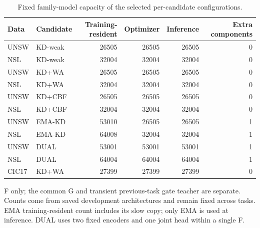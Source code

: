 \begin{table}[t]
\centering\scriptsize
\setlength{\tabcolsep}{3.8pt}
\caption{Fixed family-model capacity of the selected per-candidate configurations.}\label{tab:fixed-compact-capacity}
\begin{tabular}{llrrrr}
\toprule
Data & Candidate & Training-resident & Optimizer & Inference & Extra components \\
\midrule
UNSW & KD-weak & 26505 & 26505 & 26505 & 0 \\
NSL & KD-weak & 32004 & 32004 & 32004 & 0 \\
UNSW & KD+WA & 26505 & 26505 & 26505 & 0 \\
NSL & KD+WA & 32004 & 32004 & 32004 & 0 \\
UNSW & KD+CBF & 26505 & 26505 & 26505 & 0 \\
NSL & KD+CBF & 32004 & 32004 & 32004 & 0 \\
UNSW & EMA-KD & 53010 & 26505 & 26505 & 1 \\
NSL & EMA-KD & 64008 & 32004 & 32004 & 1 \\
UNSW & DUAL & 53001 & 53001 & 53001 & 1 \\
NSL & DUAL & 64004 & 64004 & 64004 & 1 \\
CIC17 & KD+WA & 27399 & 27399 & 27399 & 0 \\
\bottomrule
\end{tabular}
\par\vspace{2pt}\begin{minipage}{.98\linewidth}\footnotesize F only; the common G and transient previous-task gate teacher are separate. Counts come from saved development architectures and remain fixed across tasks. EMA training-resident count includes its slow copy; only EMA is used at inference. DUAL uses two fixed encoders and one joint head within a single F.\end{minipage}
\end{table}
